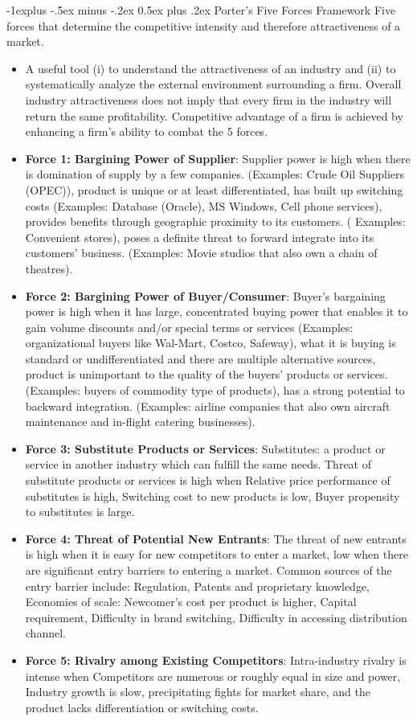 \documentclass[12pt, landscape]{article}
\makeatletter
\renewcommand{\subsection}{\@startsection{subsection}{2}{0mm}%
                                {-1explus -.5ex minus -.2ex}%
                                {0.5ex plus .2ex}%
                                {\normalfont\normalsize\bfseries}}
\makeatother
\begin{document}
\begin{multicols*}{3}
\subsection{Porter's Five Forces Framework}
Five forces that determine the competitive intensity and therefore attractiveness of a market.
\begin{itemize}
\item A useful tool (i) to understand the attractiveness of an industry and (ii) to systematically analyze the external environment surrounding a firm. Overall industry attractiveness does not imply that every firm in the industry will return the same profitability. Competitive advantage of a firm is achieved by enhancing a firm’s ability to combat the 5 forces.
\item \textbf{Force 1: Bargining Power of Supplier}: Supplier power is high when there is domination of supply by a few companies. (Examples: Crude Oil Suppliers (OPEC)), product is unique or at least differentiated, has built up switching costs (Examples: Database (Oracle), MS Windows, Cell phone services), provides benefits through geographic proximity to its customers. ( Examples: Convenient stores), poses a definite threat to forward integrate into its customers’ business. (Examples: Movie studios that also own a chain of theatres).
\item \textbf{Force 2: Bargining Power of Buyer/Consumer}: Buyer’s bargaining power is high when it has large, concentrated buying power that enables it to gain volume discounts and/or special terms or services (Examples: organizational buyers like Wal-Mart, Costco, Safeway), what it is buying is standard or undifferentiated and there are multiple alternative sources, product is unimportant to the quality of the buyers’ products or services. (Examples: buyers of commodity type of products), has a strong potential to backward integration. (Examples: airline companies that also own aircraft maintenance and in-flight catering businesses).
\item \textbf{Force 3: Substitute Products or Services}: Substitutes: a product or service in another industry which can fulfill the same needs. Threat of substitute products or services is high when  Relative price performance of substitutes is high, Switching cost to new products is low, Buyer propensity to substitutes is large.
\item \textbf{Force 4: Threat of Potential New Entrants}: The threat of new entrants is high when it is easy for new competitors to enter a market, low when there are significant entry barriers to entering a market. Common sources of the entry barrier include: Regulation, Patents and proprietary knowledge, Economies of scale: Newcomer’s cost per product is higher, Capital requirement, Difficulty in brand switching, Difficulty in accessing distribution channel.
\item \textbf{Force 5: Rivalry among Existing Competitors}: Intra-industry rivalry is intense when Competitors are numerous or roughly equal in size and power, Industry growth is slow, precipitating fights for market share, and the product lacks differentiation or switching costs.
\end{itemize}


\end{multicols*}
\end{document}
